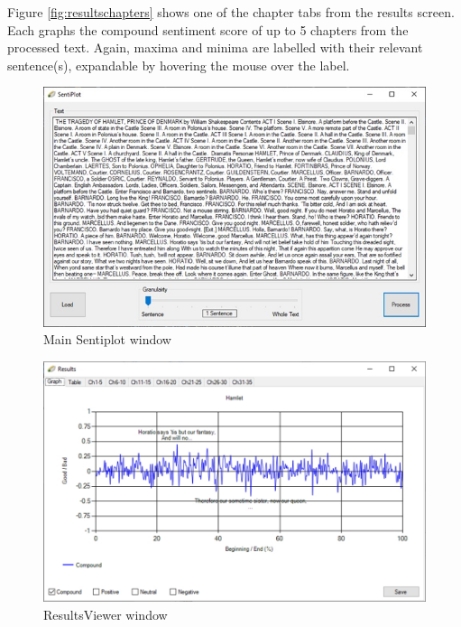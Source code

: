 \documentclass{article}
\begin{document}
{        Figure \ref{fig:resultschapters} shows one of the chapter tabs from the results screen. Each graphs the compound sentiment score of up to 5 chapters from the processed text. Again, maxima and minima are labelled with their relevant sentence(s), expandable by hovering the mouse over the label.
        \begin{figure}[htbp]
            \includegraphics[width=1\textwidth]{Figures/Misc/sentiplot}
            \caption{Main Sentiplot window}
            \label{fig:sentiplot}
        \end{figure}
        \begin{figure}[htbp]
            \includegraphics[width=1\textwidth]{Figures/Misc/resultsviewer}
            \caption{ResultsViewer window}
            \label{fig:resultsviewer}
        \end{figure}
        \begin{figure}[htbp]

\end{figure}}
\end{document}
